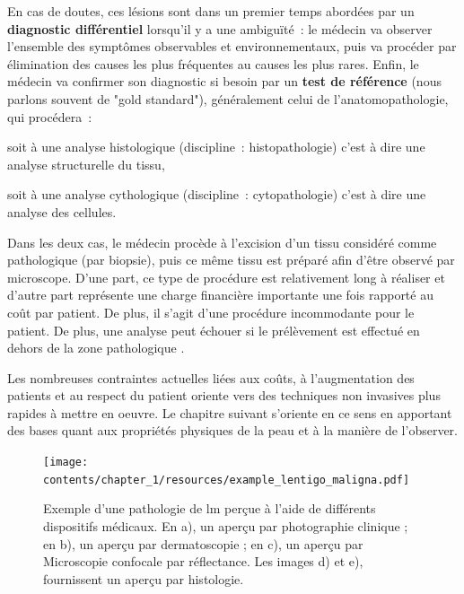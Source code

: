 En cas de doutes, ces lésions sont dans un premier temps abordées par un \textbf{diagnostic différentiel} lorsqu'il y a une ambiguïté~: le médecin va observer l'ensemble des symptômes observables et environnementaux, puis va procéder par élimination des causes les plus fréquentes au causes les plus rares. Enfin, le médecin va confirmer son diagnostic si besoin par un \textbf{test de référence} (nous parlons souvent de "gold standard"), généralement celui de l'anatomopathologie, qui procédera~:
\begin{inlinerate}
    \item soit à une analyse histologique (discipline~: histopathologie) c'est à dire une analyse structurelle du tissu,
    \item soit à une analyse cythologique (discipline~: cytopathologie) c'est à dire une analyse des cellules.
\end{inlinerate}
Dans les deux cas, le médecin procède à l'excision d'un tissu considéré comme pathologique (par biopsie), puis ce même tissu est préparé afin d'être observé par microscope. D'une part, ce type de procédure est relativement long à réaliser et d'autre part représente une charge financière importante une fois rapporté au coût par patient. De plus, il s'agit d'une procédure incommodante pour le patient. De plus, une analyse peut échouer si le prélèvement est effectué en dehors de la zone pathologique \cite{LeGal2011}.\par

Les nombreuses contraintes actuelles liées aux coûts, à l'augmentation des patients et au respect du patient oriente vers des techniques non invasives plus rapides à mettre en oeuvre. Le chapitre suivant s'oriente en ce sens en apportant des bases quant aux propriétés physiques de la peau et à la manière de l'observer.\par

\begin{figure}[H]
    \centering
    \texttt{[image: contents/chapter\_1/resources/example\_lentigo\_maligna.pdf]}
    \caption{Exemple d'une pathologie de \gls{lm} perçue à l'aide de différents dispositifs médicaux. En a), un aperçu par photographie clinique ; en b), un aperçu par dermatoscopie ; en c), un aperçu par Microscopie confocale par réflectance. Les images d) et e), fournissent un aperçu par histologie.}
    \label{fig:example_lentigo_maligna}
\end{figure}\par